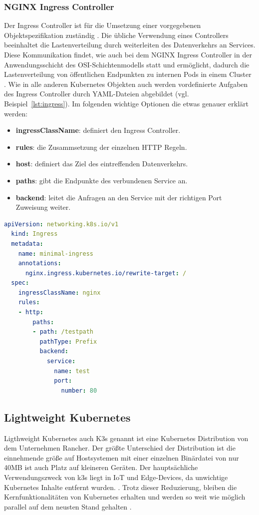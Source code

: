 \subsubsection{NGINX Ingress Controller}
Der Ingress Controller ist für die Umsetzung einer vorgegebenen Objektspezifikation zuständig \cite{kubernetesingress}.
Die übliche Verwendung eines Controllers beeinhaltet die Lastenverteilung durch weiterleiten des Datenverkehrs an Services. 
Diese Kommunikation findet, wie auch bei dem NGINX Ingress Controller \cite{kubernetesingresscontrollerlayer} in der Anwendungsschicht des OSI-Schichtenmodells statt und ermöglicht, dadurch die 
Lastenverteilung von öffentlichen Endpunkten zu internen Pods in einem Cluster \cite{kubernetesingressibm}.
Wie in alle anderen Kubernetes Objekten auch werden vordefinierte Aufgaben des Ingress Controller durch YAML-Dateien abgebildet (vgl. Beispiel~\ref{lst:ingress}).
Im folgenden wichtige Optionen die etwas genauer erklärt werden:

\begin{itemize}
  \item \textbf{ingressClassName}: definiert den Ingress Controller.
  \item \textbf{rules}: die Zusammsetzung der einzelnen HTTP Regeln.
  \item \textbf{host}: definiert das Ziel des eintreffenden Datenverkehrs.
  \item \textbf{paths}: gibt die Endpunkte des verbundenen Service an.
  \item \textbf{backend}: leitet die Anfragen an den Service mit der richtigen Port Zuweisung weiter.
\end{itemize}

\begin{lstlisting}[caption={ingress.yaml \cite{kubernetesingress} },captionpos=b,label={lst:ingress},language=yaml]
  apiVersion: networking.k8s.io/v1
  kind: Ingress
  metadata:
    name: minimal-ingress
    annotations:
      nginx.ingress.kubernetes.io/rewrite-target: /
  spec:
    ingressClassName: nginx
    rules:
    - http:
        paths:
        - path: /testpath
          pathType: Prefix
          backend:
            service:
              name: test
              port:
                number: 80
  \end{lstlisting}

\subsection{Lightweight Kubernetes} \label{k3s}
Ligthweight Kubernetes auch K3s genannt ist eine Kubernetes Distribution von dem Unternehmen
Rancher. Der größte Unterschied der Distribution ist die einnehmende größe 
auf Hostsystemen mit einer einzelnen Binärdatei von nur 40MB ist auch Platz auf kleineren Geräten.
Der hauptsächliche Verwendungszweck von k3s liegt in IoT und Edge-Devices, da unwichtige Kubernetes Inhalte entfernt wurden. \cite{k3s}.
Trotz dieser Reduzierung, bleiben die Kernfunktionalitäten von Kubernetes erhalten und werden 
so weit wie möglich parallel auf dem neusten Stand gehalten \cite{k3sgit}.

